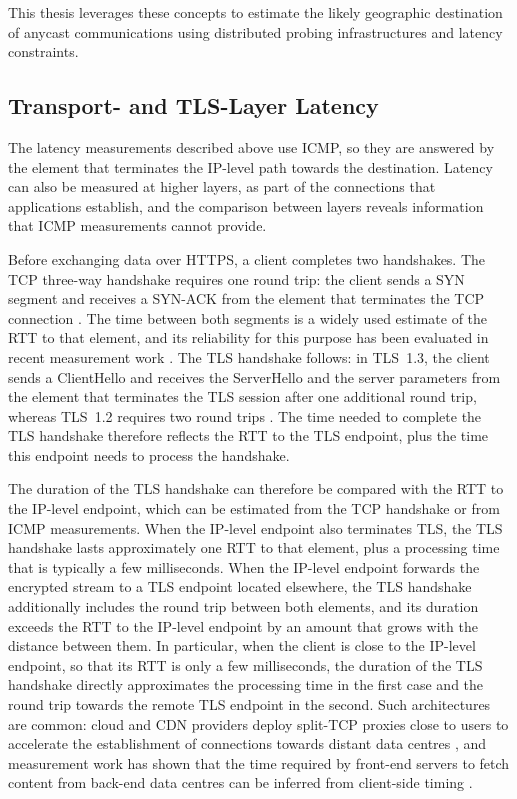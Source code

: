 This thesis leverages these concepts to estimate the likely geographic destination of anycast communications using distributed probing infrastructures and latency constraints.

\subsection{Transport- and TLS-Layer Latency}
\label{sc:background_location_measurements_cross_layer}

The latency measurements described above use ICMP, so they are answered by the element that terminates the IP-level path towards the destination. Latency can also be measured at higher layers, as part of the connections that applications establish, and the comparison between layers reveals information that ICMP measurements cannot provide.

Before exchanging data over HTTPS, a client completes two handshakes. The TCP three-way handshake requires one round trip: the client sends a SYN segment and receives a SYN-ACK from the element that terminates the TCP connection \cite{Eddy2022TransmissionTCP}. The time between both segments is a widely used estimate of the RTT to that element, and its reliability for this purpose has been evaluated in recent measurement work \cite{Ramesh2024CalcuLatency:Abuse}. The TLS handshake follows: in TLS~1.3, the client sends a ClientHello and receives the ServerHello and the server parameters from the element that terminates the TLS session after one additional round trip, whereas TLS~1.2 requires two round trips \cite{Rescorla2026The1.3}. The time needed to complete the TLS handshake therefore reflects the RTT to the TLS endpoint, plus the time this endpoint needs to process the handshake.

The duration of the TLS handshake can therefore be compared with the RTT to the IP-level endpoint, which can be estimated from the TCP handshake or from ICMP measurements. When the IP-level endpoint also terminates TLS, the TLS handshake lasts approximately one RTT to that element, plus a processing time that is typically a few milliseconds. When the IP-level endpoint forwards the encrypted stream to a TLS endpoint located elsewhere, the TLS handshake additionally includes the round trip between both elements, and its duration exceeds the RTT to the IP-level endpoint by an amount that grows with the distance between them. In particular, when the client is close to the IP-level endpoint, so that its RTT is only a few milliseconds, the duration of the TLS handshake directly approximates the processing time in the first case and the round trip towards the remote TLS endpoint in the second. Such architectures are common: cloud and CDN providers deploy split-TCP proxies close to users to accelerate the establishment of connections towards distant data centres \cite{Pathak2010MeasuringServices}, and measurement work has shown that the time required by front-end servers to fetch content from back-end data centres can be inferred from client-side timing \cite{Chen2011CharacterizingDistribution}.

